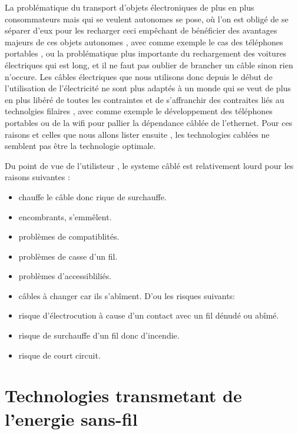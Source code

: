 \documentclass[12pt]{report}
\begin{document}
  La problématique du transport d'objets électroniques de plus en plus consommateurs mais qui se veulent autonomes se pose, où l'on est obligé de se séparer d'eux pour les recharger ceci empêchant de bénéficier des avantages majeurs de ces objets autonomes , avec comme exemple le cas des téléphones portables , ou la problématique plus importante du rechargement des voitures électriques qui est long, et il ne faut pas oublier de brancher un câble sinon rien n'occure. Les câbles électriques que nous utilisons donc depuis le début de l'utilisation de l'électricité ne sont plus adaptés à un monde qui se veut de plus en plus libéré de toutes les contraintes et de s'affranchir des contraites liés au technolgies filaires , avec comme exemple le développement des téléphones portables ou de la wifi pour pallier la dépendance câblée de l'ethernet. Pour ces raisons et celles que nous allons lister ensuite , les technologies cablées ne semblent pas être la technologie optimale.

	Du point de vue de l'utilisteur , le systeme câblé est relativement lourd pour les raisons suivantes :
\begin{itemize}
	\item chauffe le câble donc rique de surchauffe.
	\item encombrants, s'emmêlent.
	\item problèmes de compatiblités.
	\item problèmes de casse d'un fil.
	\item problèmes d'accessibliliés.
	\item câbles à changer car ils s'abîment.
	D'ou les risques suivants:
	\item risque d'électrocution à cause d'un contact avec un fil dénudé ou abîmé.
	\item risque de surchauffe d'un fil donc d'incendie.
	\item risque de court circuit.
\end{itemize}
\section{Technologies transmetant de l'energie sans-fil \cite{wiki5}}
\end{document}
